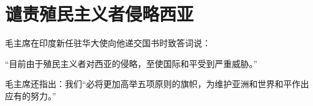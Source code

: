 \section[谴责殖民主义者侵略西亚（一九五八年七月二十八日）]{谴责殖民主义者侵略西亚}


毛主席在印度新任驻华大使向他递交国书时致答词说：

“目前由于殖民主义者对西亚的侵略，至使国际和平受到严重威胁。”

毛主席还指出：我们“必将更加高举五项原则的旗帜，为维护亚洲和世界和平作出应有的努力。”


